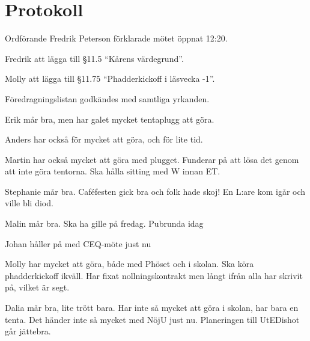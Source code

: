 \documentclass[10pt]{article}
\def\mo{Fredrik Peterson}
\begin{document}
\section*{Protokoll}
\begin{paragrafer}
Ordförande {\mo} förklarade mötet öppnat 12:20.

\valavmo

\valavms

\tosg

\ingaadj


\valavj

Fredrik \ypa att lägga till \S11.5 ``Kårens värdegrund''.

Molly \ypa att lägga till \S11.75 ``Phadderkickoff i läsvecka -1''.

Föredragningslistan godkändes med samtliga yrkanden.


\begin{fyllnadsval} %
\end{fyllnadsval}

\begin{paragrafer}
Erik mår bra, men har galet mycket tentaplugg att göra.

Anders har också för mycket att göra, och för lite tid.

Martin har också mycket att göra med plugget. Funderar på att lösa det genom att inte göra tentorna. Ska hålla sitting med W innan ET.

Stephanie mår bra. Caféfesten gick bra och folk hade skoj! En L:are kom igår och ville bli diod.

Malin mår bra. Ska ha gille på fredag. Pubrunda idag

Johan håller på med CEQ-möte just nu

Molly har mycket att göra, både med Phöset och i skolan. Ska köra phadderkickoff ikväll. Har fixat nollningskontrakt men långt ifrån alla har skrivit på, vilket är segt.

Dalia mår bra, lite trött bara. Har inte så mycket att göra i skolan, har bara en tenta. Det händer inte så mycket med NöjU just nu. Planeringen till UtEDishot går jättebra.


\end{paragrafer}
\end{paragrafer}
\end{document}
